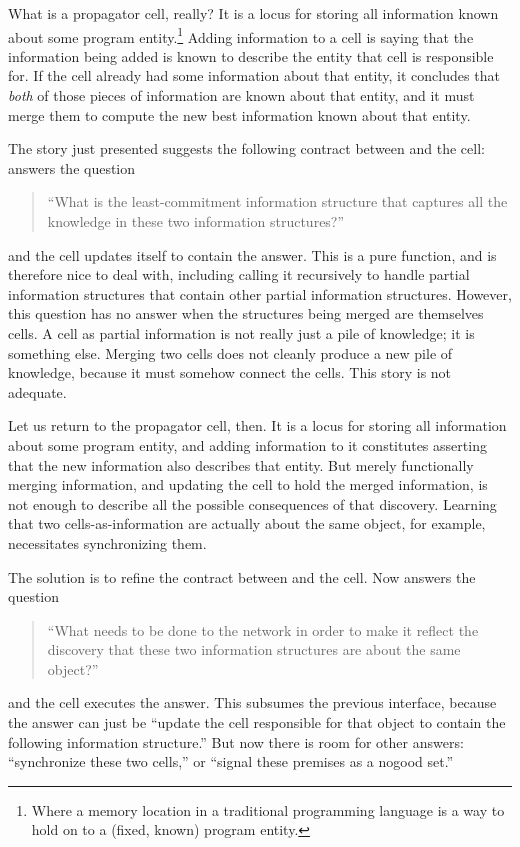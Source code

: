 \documentclass[12pt,letterpaper]{article}
\begin{document}
What is a propagator cell, really?  It is a locus for storing all
information known about some program entity.\footnote{Where a memory
  location in a traditional programming language is a way to hold on
  to a (fixed, known) program entity.}  Adding information to a cell
is saying that the information being added is known to describe the
entity that cell is responsible for.  If the cell already had some
information about that entity, it concludes that \emph{both} of those
pieces of information are known about that entity, and it must merge
them to compute the new best information known about that entity.

The story just presented suggests the following contract between
 and the cell:  answers the question
\begin{quote}
``What is the least-commitment information structure that captures
all the knowledge in these two information structures?''
\end{quote}
and the cell updates itself to contain the answer.  This 
is a pure function, and is therefore nice to deal with, including
calling it recursively to handle partial information structures that
contain other partial information structures.  However, this question
has no answer when the structures being merged are themselves cells.
A cell as partial information is not really just a pile of knowledge;
it is something else.  Merging two cells does not cleanly produce a
new pile of knowledge, because it must somehow connect the cells.
This story is not adequate.

Let us return to the propagator cell, then.  It is a locus for storing
all information about some program entity, and adding information to
it constitutes asserting that the new information also describes that
entity.  But merely functionally merging information, and updating the
cell to hold the merged information, is not enough to describe all the
possible consequences of that discovery.  Learning that two
cells-as-information are actually about the same object, for example,
necessitates synchronizing them.

The solution is to refine the contract between  and the
cell.  Now  answers the question
\begin{quote}
``What needs to be done to the network in order to make it reflect the
discovery that these two information structures are about the same
object?''
\end{quote}
and the cell executes the answer.  This subsumes the previous
interface, because the answer can just be ``update the cell
responsible for that object to contain the following information
structure.''  But now there is room for other answers: ``synchronize
these two cells,'' or ``signal these premises as a nogood set.''
\end{document}
